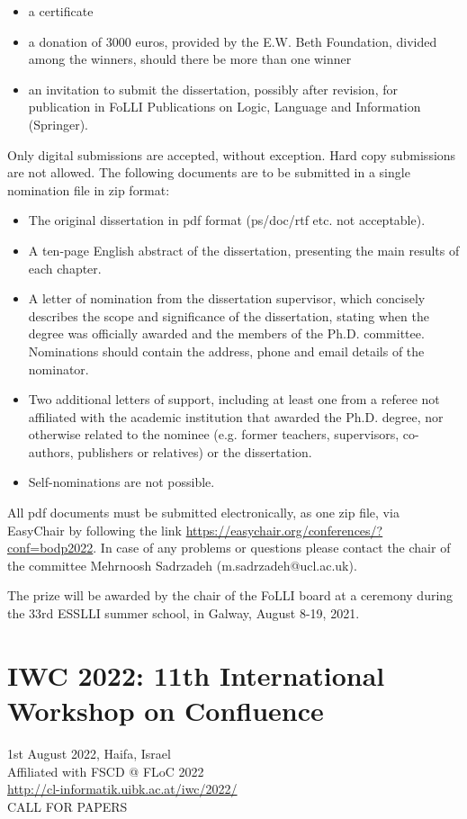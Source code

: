 \documentclass[prodmode,acmtecs]{acmsmall} %
\begin{document}
\begin{itemize}
\begin{itemize}\item  a certificate
\item  a donation of 3000 euros, provided by the E.W. Beth Foundation, divided among the winners, should there be more than one winner
\item  an invitation to submit the dissertation, possibly after revision, for publication in FoLLI Publications on Logic, Language and Information (Springer). 
\end{itemize} 
 Only digital submissions are accepted, without exception. Hard copy submissions are not allowed. The following documents are to be submitted in a single nomination file in zip format:  
 
\begin{itemize}\item  The original dissertation in pdf format (ps/doc/rtf etc. not acceptable).
\item  A ten-page English abstract of the dissertation, presenting the main results of each chapter.
\item  A letter of nomination from the dissertation supervisor, which concisely describes the scope and significance of the dissertation, stating when the degree was officially awarded and the members of the Ph.D. committee. Nominations should contain the address, phone and email details of the nominator.
\item  Two additional letters of support, including at least one from a referee not affiliated with the academic institution that awarded the Ph.D. degree, nor otherwise related to the nominee (e.g. former teachers, supervisors, co-authors, publishers or relatives) or the dissertation.
\item  Self-nominations are not possible. 
\end{itemize} 
  All pdf documents must be submitted electronically, as one zip file, via EasyChair by following the link \href{https://easychair.org/conferences/?conf=bodp2022}{https://easychair.org/conferences/?conf=bodp2022}. In case of any problems or questions please contact the chair of the committee Mehrnoosh Sadrzadeh (m.sadrzadeh@ucl.ac.uk).  
 
  The prize will be awarded by the chair of the FoLLI board at a ceremony during the 33rd ESSLLI summer school, in Galway, August 8-19, 2021.  
 
\end{itemize}\section{IWC 2022: 11th International Workshop on Confluence}\label{IWC2022}  1st August 2022, Haifa, Israel\\ 
  Affiliated with FSCD @ FLoC 2022\\ 
  \href{http://cl-informatik.uibk.ac.at/iwc/2022/}{http://cl-informatik.uibk.ac.at/iwc/2022/}\\ 
CALL FOR PAPERS 
\end{document}
